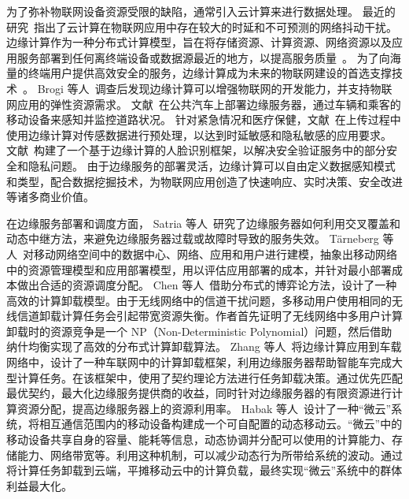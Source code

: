 为了弥补物联网设备资源受限的缺陷，通常引入云计算来进行数据处理。
最近的研究~\cite{DBLP:journals/iotj/RazzaqueMPC16}指出了云计算在物联网应用中存在较大的时延和不可预测的网络抖动干扰。
边缘计算作为一种分布式计算模型，旨在将存储资源、计算资源、网络资源以及应用服务部署到任何离终端设备或数据源最近的地方，以提高服务质量~\cite{AI201877}。
为了向海量的终端用户提供高效安全的服务，边缘计算成为未来的物联网建设的首选支撑技术~\cite{DBLP:journals/iotj/LinYZYZZ17}。
Brogi 等人~\cite{DBLP:Journals/IOTj/BroGif17}调查后发现边缘计算可以增强物联网的开发能力，并支持物联网应用的弹性资源需求。
文献~在公共汽车上部署边缘服务器，通过车辆和乘客的移动设备来感知并监控道路状况。
针对紧急情况和医疗保健，文献~在上传过程中使用边缘计算对传感数据进行预处理，以达到时延敏感和隐私敏感的应用要求。
文献~构建了一个基于边缘计算的人脸识别框架，以解决安全验证服务中的部分安全和隐私问题。
由于边缘服务的部署灵活，边缘计算可以自由定义数据感知模式和类型，配合数据挖掘技术，为物联网应用创造了快速响应、实时决策、安全改进等诸多商业价值。

在边缘服务部署和调度方面，
Satria 等人~\cite{DBLP:journals/fgcs/SatriaPJ17}研究了边缘服务器如何利用交叉覆盖和动态中继方法，来避免边缘服务器过载或故障时导致的服务失效。
T{\"{a}}rneberg 等人~\cite{DBLP:journals/fgcs/TarnebergMWTEKE17}对移动网络空间中的数据中心、网络、应用和用户进行建模，抽象出移动网络中的资源管理模型和应用部署模型，用以评估应用部署的成本，并针对最小部署成本做出合适的资源调度分配。
Chen 等人~\cite{DBLP:journals/ton/ChenJLF16}借助分布式的博弈论方法，设计了一种高效的计算卸载模型。由于无线网络中的信道干扰问题，多移动用户使用相同的无线信道卸载计算任务会引起带宽资源失衡。作者首先证明了无线网络中多用户计算卸载时的资源竞争是一个 NP（Non-Deterministic Polynomial）问题，然后借助纳什均衡实现了高效的分布式计算卸载算法。
Zhang 等人~\cite{DBLP:conf/rndm/ZhangMLV016}将边缘计算应用到车载网络中，设计了一种车联网中的计算卸载框架，利用边缘服务器帮助智能车完成大型计算任务。在该框架中，使用了契约理论方法进行任务卸载决策。通过优先匹配最优契约，最大化边缘服务提供商的收益，同时针对边缘服务器的有限资源进行计算资源分配，提高边缘服务器上的资源利用率。
Habak 等人~\cite{DBLP:conf/IEEEcloud/HabakAHZ15}设计了一种“微云”系统，将相互通信范围内的移动设备构建成一个可自配置的动态移动云。“微云”中的移动设备共享自身的容量、能耗等信息，动态协调并分配可以使用的计算能力、存储能力、网络带宽等。利用这种机制，可以减少动态行为所带给系统的波动。通过将计算任务卸载到云端，平摊移动云中的计算负载，最终实现“微云”系统中的群体利益最大化。


